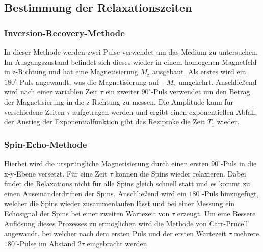 \documentclass[numbers=noenddot,a4paper,notitlepage,twoside,BCOR15mm]{scrartcl}
\begin{document}
	\subsection{Bestimmung der Relaxationszeiten}
	
	\subsubsection{Inversion-Recovery-Methode}
	In dieser Methode werden zwei Pulse verwendet um das Medium zu untersuchen. Im Ausgangszustand befindet sich dieses wieder in einem homogenen Magnetfeld in z-Richtung und hat eine Magnetisierung $M_\mathrm{z}$ ausgebaut. Als erstes wird ein $180^\circ$-Puls angewandt, was die Magnetisierung auf $-M_\mathrm{z}$ umgekehrt. Anschließend wird nach einer variablen Zeit $\tau$ ein zweiter $90^\circ$-Puls verwendet um den Betrag der Magnetisierung in die z-Richtung zu messen. Die Amplitude kann für verschiedene Zeiten $\tau$ aufgetragen werden und ergibt einen exponentiellen Abfall. der Anstieg der Exponentialfunktion gibt das Reziproke die Zeit $T_1$ wieder.
	\subsubsection{Spin-Echo-Methode}
		Hierbei wird die ursprüngliche Magnetisierung durch einen ersten $90^\circ$-Puls in die x-y-Ebene versetzt. Für eine Zeit $\tau$ können die Spins wieder relaxieren. Dabei findet die Relaxations nicht für alle Spins gleich schnell statt und es kommt zu einen Auseinanderdriften der Spins. Anschließend wird ein $180^\circ$-Puls hinzugefügt, welcher die Spins wieder zusammenlaufen lässt und bei einer Messung ein Echosignal der Spins bei einer zweiten Wartezeit von $\tau$ erzeugt. Um eine Bessere Auflösung dieses Prozesses zu ermöglichen wird die Methode von Carr-Prucell angewandt, bei welcher nach dem ersten Puls und der ersten Wartezeit $\tau$ mehrere $180^\circ$-Pulse im Abstand $2\tau$ eingebracht werden. 
		\newpage
\end{document}
